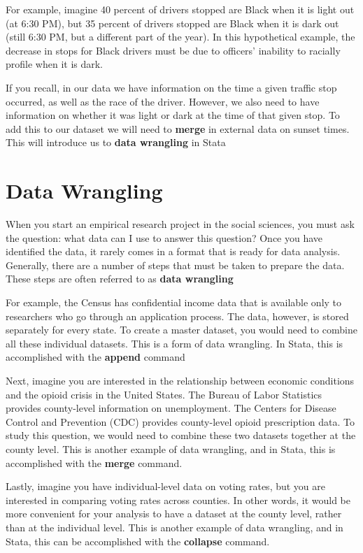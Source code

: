 \documentclass[
]{book}
\begin{document}
For example, imagine 40 percent of drivers stopped are Black when it is light out (at 6:30 PM), but 35 percent of drivers stopped are Black when it is dark out (still 6:30 PM, but a different part of the year). In this hypothetical example, the decrease in stops for Black drivers must be due to officers' inability to racially profile when it is dark.

If you recall, in our data we have information on the time a given traffic stop occurred, as well as the race of the driver. However, we also need to have information on whether it was light or dark at the time of that given stop. To add this to our dataset we will need to \textbf{merge} in external data on sunset times. This will introduce us to \textbf{data wrangling} in Stata

\section{Data Wrangling}\label{data-wrangling}

When you start an empirical research project in the social sciences, you must ask the question: what data can I use to answer this question? Once you have identified the data, it rarely comes in a format that is ready for data analysis. Generally, there are a number of steps that must be taken to prepare the data. These steps are often referred to as \textbf{data wrangling}

For example, the Census has confidential income data that is available only to researchers who go through an application process. The data, however, is stored separately for every state. To create a master dataset, you would need to combine all these individual datasets. This is a form of data wrangling. In Stata, this is accomplished with the \textbf{append} command

Next, imagine you are interested in the relationship between economic conditions and the opioid crisis in the United States. The Bureau of Labor Statistics provides county-level information on unemployment. The Centers for Disease Control and Prevention (CDC) provides county-level opioid prescription data. To study this question, we would need to combine these two datasets together at the county level. This is another example of data wrangling, and in Stata, this is accomplished with the \textbf{merge} command.

Lastly, imagine you have individual-level data on voting rates, but you are interested in comparing voting rates across counties. In other words, it would be more convenient for your analysis to have a dataset at the county level, rather than at the individual level. This is another example of data wrangling, and in Stata, this can be accomplished with the \textbf{collapse} command.
\end{document}
